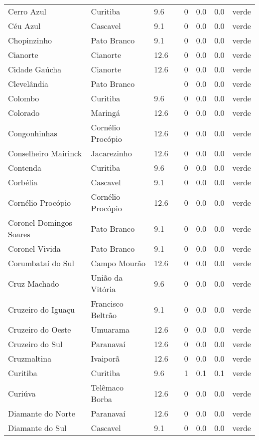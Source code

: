 \begin{longtable}{l|lllllll}
  Cerro Azul & Curitiba & 9.6 &  & 0 & 0.0 & 0.0 & verde \\ 
  Céu Azul & Cascavel & 9.1 &  & 0 & 0.0 & 0.0 & verde \\ 
  Chopinzinho & Pato Branco & 9.1 &  & 0 & 0.0 & 0.0 & verde \\ 
  Cianorte & Cianorte & 12.6 &  & 0 & 0.0 & 0.0 & verde \\ 
  Cidade Gaúcha & Cianorte & 12.6 &  & 0 & 0.0 & 0.0 & verde \\ 
  Clevelândia & Pato Branco &  &  & 0 & 0.0 & 0.0 & verde \\ 
  Colombo & Curitiba & 9.6 &  & 0 & 0.0 & 0.0 & verde \\ 
  Colorado & Maringá & 12.6 &  & 0 & 0.0 & 0.0 & verde \\ 
  Congonhinhas & Cornélio Procópio & 12.6 &  & 0 & 0.0 & 0.0 & verde \\ 
  Conselheiro Mairinck & Jacarezinho & 12.6 &  & 0 & 0.0 & 0.0 & verde \\ 
  Contenda & Curitiba & 9.6 &  & 0 & 0.0 & 0.0 & verde \\ 
  Corbélia & Cascavel & 9.1 &  & 0 & 0.0 & 0.0 & verde \\ 
  Cornélio Procópio & Cornélio Procópio & 12.6 &  & 0 & 0.0 & 0.0 & verde \\ 
  Coronel Domingos Soares & Pato Branco & 9.1 &  & 0 & 0.0 & 0.0 & verde \\ 
  Coronel Vivida & Pato Branco & 9.1 &  & 0 & 0.0 & 0.0 & verde \\ 
  Corumbataí do Sul & Campo Mourão & 12.6 &  & 0 & 0.0 & 0.0 & verde \\ 
  Cruz Machado & União da Vitória & 9.6 &  & 0 & 0.0 & 0.0 & verde \\ 
  Cruzeiro do Iguaçu & Francisco Beltrão & 9.1 &  & 0 & 0.0 & 0.0 & verde \\ 
  Cruzeiro do Oeste & Umuarama & 12.6 &  & 0 & 0.0 & 0.0 & verde \\ 
  Cruzeiro do Sul & Paranavaí & 12.6 &  & 0 & 0.0 & 0.0 & verde \\ 
  Cruzmaltina & Ivaiporã & 12.6 &  & 0 & 0.0 & 0.0 & verde \\ 
  Curitiba & Curitiba & 9.6 &  & 1 & 0.1 & 0.1 & verde \\ 
  Curiúva & Telêmaco Borba & 12.6 &  & 0 & 0.0 & 0.0 & verde \\ 
  Diamante do Norte & Paranavaí & 12.6 &  & 0 & 0.0 & 0.0 & verde \\ 
  Diamante do Sul & Cascavel & 9.1 &  & 0 & 0.0 & 0.0 & verde \\ 

\end{longtable}
